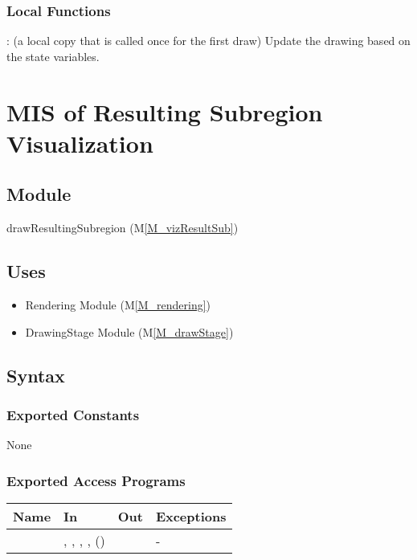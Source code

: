 \documentclass[12pt, titlepage]{article}
\newcommand{\mref}[1]{M\ref{#1}}
\newcommand{\mrefp}[1]{(\mref{#1})}
\newcommand{\mreff}[1]{Module \mrefp{#1}}
\begin{document}
\subsubsection{Local Functions}
: (a local copy that is called once for the first draw)
  Update the drawing based on the state variables.

\newpage



\section{MIS of Resulting Subregion Visualization} \label{MS_vizResultSub}

\subsection{Module}
drawResultingSubregion \mrefp{M_vizResultSub}

\subsection{Uses}
\begin{itemize}
  \item Rendering \mreff{M_rendering}
  \item DrawingStage \mreff{M_drawStage}
\end{itemize}

\subsection{Syntax}

\subsubsection{Exported Constants}
None
\subsubsection{Exported Access Programs}

\begin{center}
\begin{tabular}{L{5cm} L{4cm} L{4cm} L{2cm}}
\hline
\textbf{Name} & \textbf{In} & \textbf{Out} & \textbf{Exceptions} \\
\hline
{} & , ,
  , ,  ()
  &  & - \\
\hline
\end{tabular}
\end{center}
\end{document}
